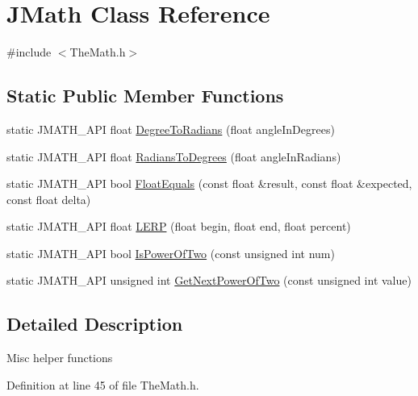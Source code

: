 \hypertarget{class_j_math}{\section{J\+Math Class Reference}
\label{class_j_math}
}


{\ttfamily \#include $<$The\+Math.\+h$>$}

\subsection*{Static Public Member Functions}
\begin{DoxyCompactItemize}
\item 
static J\+M\+A\+T\+H\+\_\+\+A\+P\+I float \hyperlink{class_j_math_adf7cf335e88d3213e2c96fc375f7d520}{Degree\+To\+Radians} (float angle\+In\+Degrees)
\item 
static J\+M\+A\+T\+H\+\_\+\+A\+P\+I float \hyperlink{class_j_math_a8d07f246888cf283fd43264692d066eb}{Radians\+To\+Degrees} (float angle\+In\+Radians)
\item 
static J\+M\+A\+T\+H\+\_\+\+A\+P\+I bool \hyperlink{class_j_math_a32759f9737252a7bf241b350e32ac1dd}{Float\+Equals} (const float \&result, const float \&expected, const float delta)
\item 
static J\+M\+A\+T\+H\+\_\+\+A\+P\+I float \hyperlink{class_j_math_a358df165152123975b1b3856bc2f448d}{L\+E\+R\+P} (float begin, float end, float percent)
\item 
static J\+M\+A\+T\+H\+\_\+\+A\+P\+I bool \hyperlink{class_j_math_aa57aa01d2ac817abaa45bf270d9b86e4}{Is\+Power\+Of\+Two} (const unsigned int num)
\item 
static J\+M\+A\+T\+H\+\_\+\+A\+P\+I unsigned int \hyperlink{class_j_math_a9fd9d5d1abe2819797318dc741b0df93}{Get\+Next\+Power\+Of\+Two} (const unsigned int value)
\end{DoxyCompactItemize}


\subsection{Detailed Description}
Misc helper functions 

Definition at line 45 of file The\+Math.\+h.



